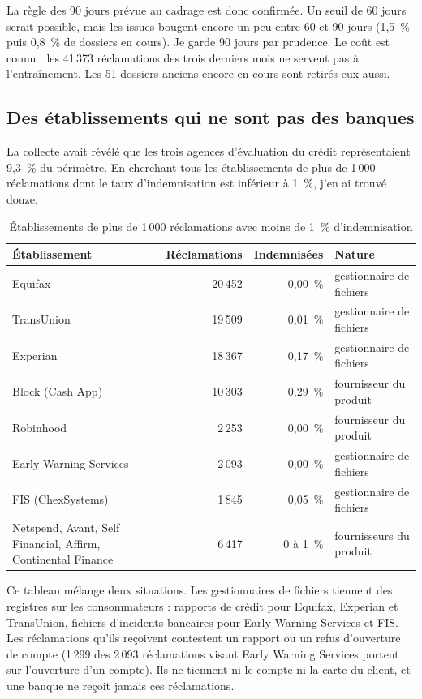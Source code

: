 \documentclass[11pt,a4paper]{article}
\begin{document}
La règle des 90 jours prévue au cadrage est donc confirmée. Un seuil de 60 jours serait possible, mais les issues bougent encore un peu entre 60 et 90 jours (1,5~\% puis 0,8~\% de dossiers en cours). Je garde 90 jours par prudence. Le coût est connu : les 41\,373 réclamations des trois derniers mois ne servent pas à l'entraînement. Les 51 dossiers anciens encore en cours sont retirés eux aussi.

\subsection{Des établissements qui ne sont pas des banques}

La collecte avait révélé que les trois agences d'évaluation du crédit représentaient 9,3~\% du périmètre. En cherchant tous les établissements de plus de 1\,000 réclamations dont le taux d'indemnisation est inférieur à 1~\%, j'en ai trouvé douze.

\begin{table}[H]
\centering\small
\begin{tabularx}{\linewidth}{@{}Y r r l@{}}
\toprule
Établissement & Réclamations & Indemnisées & Nature \\
\midrule
Equifax & 20\,452 & 0,00~\% & gestionnaire de fichiers \\
TransUnion & 19\,509 & 0,01~\% & gestionnaire de fichiers \\
Experian & 18\,367 & 0,17~\% & gestionnaire de fichiers \\
Block (Cash App) & 10\,303 & 0,29~\% & fournisseur du produit \\
Robinhood & 2\,253 & 0,00~\% & fournisseur du produit \\
Early Warning Services & 2\,093 & 0,00~\% & gestionnaire de fichiers \\
FIS (ChexSystems) & 1\,845 & 0,05~\% & gestionnaire de fichiers \\
Netspend, Avant, Self Financial, Affirm, Continental Finance & 6\,417 & 0 à 1~\% & fournisseurs du produit \\
\bottomrule
\end{tabularx}
\caption{Établissements de plus de 1\,000 réclamations avec moins de 1~\% d'indemnisation}
\end{table}

Ce tableau mélange deux situations. Les gestionnaires de fichiers tiennent des registres sur les consommateurs : rapports de crédit pour Equifax, Experian et TransUnion, fichiers d'incidents bancaires pour Early Warning Services et FIS. Les réclamations qu'ils reçoivent contestent un rapport ou un refus d'ouverture de compte (1\,299 des 2\,093 réclamations visant Early Warning Services portent sur l'ouverture d'un compte). Ils ne tiennent ni le compte ni la carte du client, et une banque ne reçoit jamais ces réclamations.
\end{document}

